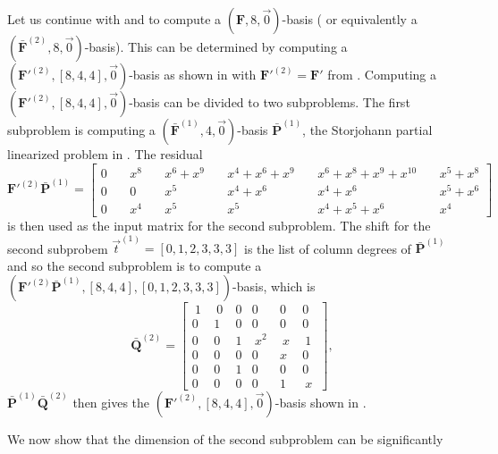 \begin{exmp}
\label{exm:subproblems} Let us continue with 
and  to compute a $\left(\mathbf{F},8,\vec{0}\right)$-basis
( or equivalently a $(\bar{\mathbf{F}}^{\left(2\right)},8,\vec{0})$-basis).
This can be determined by computing a $(\mathbf{F}'^{\left(2\right)},[8,4,4],\vec{0})$-basis
as shown in  with $\mathbf{F}'^{\left(2\right)}=\mathbf{F}'$
from . Computing a $(\mathbf{F}'^{\left(2\right)},[8,4,4],\vec{0})$-basis
can be divided to two subproblems. The first subproblem is computing
a $(\bar{\mathbf{F}}^{\left(1\right)},4,\vec{0})$-basis $\bar{\mathbf{P}}^{\left(1\right)}$,
the Storjohann partial linearized problem in .
The residual \[
\mathbf{F}'^{(2)}\bar{\mathbf{P}}^{(1)}=\left[{\begin{array}{rcccccccccc}
0 & \  & x^{8} & \  & x^{6}+x^{9} & \  & x^{4}+x^{6}+x^{9} & \  & x^{6}+x^{8}+x^{9}+x^{10} & \  & x^{5}+x^{8}\\
0 &  & 0 &  & x^{5} &  & x^{4}+x^{6} &  & x^{4}+x^{6} &  & x^{5}+x^{6}\\
0 &  & x^{4} &  & x^{5} &  & x^{5} &  & x^{4}+x^{5}+x^{6} &  & x^{4}\end{array}}\right]\]
 is then used as the input matrix for the second subproblem. The shift
for the second subprobem $\vec{t}^{(1)}=[0,1,2,3,3,3]$ is the list
of column degrees of $\bar{\mathbf{P}}^{(1)}$ and so the second subproblem
is to compute a $(\mathbf{F}'^{(2)}\bar{\mathbf{P}}^{(1)},\left[8,4,4\right],[0,1,2,3,3,3])$-basis,
which is \begin{equation}
\bar{\mathbf{Q}}^{(2)}=\left[{\begin{array}{cccccc}
~1~ & ~0~ & 0 & 0 & 0 & 0\\
0 & 1 & 0 & 0 & 0 & 0\\
0 & 0 & 1 & ~x^{2}~ & ~x~ & ~1~\\
0 & 0 & 0 & 0 & x & 0\\
0 & 0 & 1 & 0 & 0 & 0\\
0 & 0 & 0 & 0 & 1 & ~x~\end{array}}\right],\label{eq:Qbar2}\end{equation}
 $\bar{\mathbf{P}}^{(1)}\bar{\mathbf{Q}}^{(2)}$ then gives the $(\mathbf{F}'^{\left(2\right)},[8,4,4],\vec{0})$-basis
shown in . 
\end{exmp}
We now show that the dimension of the second subproblem can be significantly
